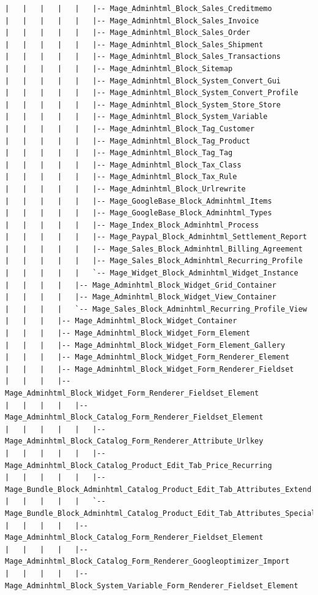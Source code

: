\documentclass[oneside]{book}
\begin{document}
\begin{lstlisting}
|   |   |   |   |   |-- Mage_Adminhtml_Block_Sales_Creditmemo
|   |   |   |   |   |-- Mage_Adminhtml_Block_Sales_Invoice
|   |   |   |   |   |-- Mage_Adminhtml_Block_Sales_Order
|   |   |   |   |   |-- Mage_Adminhtml_Block_Sales_Shipment
|   |   |   |   |   |-- Mage_Adminhtml_Block_Sales_Transactions
|   |   |   |   |   |-- Mage_Adminhtml_Block_Sitemap
|   |   |   |   |   |-- Mage_Adminhtml_Block_System_Convert_Gui
|   |   |   |   |   |-- Mage_Adminhtml_Block_System_Convert_Profile
|   |   |   |   |   |-- Mage_Adminhtml_Block_System_Store_Store
|   |   |   |   |   |-- Mage_Adminhtml_Block_System_Variable
|   |   |   |   |   |-- Mage_Adminhtml_Block_Tag_Customer
|   |   |   |   |   |-- Mage_Adminhtml_Block_Tag_Product
|   |   |   |   |   |-- Mage_Adminhtml_Block_Tag_Tag
|   |   |   |   |   |-- Mage_Adminhtml_Block_Tax_Class
|   |   |   |   |   |-- Mage_Adminhtml_Block_Tax_Rule
|   |   |   |   |   |-- Mage_Adminhtml_Block_Urlrewrite
|   |   |   |   |   |-- Mage_GoogleBase_Block_Adminhtml_Items
|   |   |   |   |   |-- Mage_GoogleBase_Block_Adminhtml_Types
|   |   |   |   |   |-- Mage_Index_Block_Adminhtml_Process
|   |   |   |   |   |-- Mage_Paypal_Block_Adminhtml_Settlement_Report
|   |   |   |   |   |-- Mage_Sales_Block_Adminhtml_Billing_Agreement
|   |   |   |   |   |-- Mage_Sales_Block_Adminhtml_Recurring_Profile
|   |   |   |   |   `-- Mage_Widget_Block_Adminhtml_Widget_Instance
|   |   |   |   |-- Mage_Adminhtml_Block_Widget_Grid_Container
|   |   |   |   |-- Mage_Adminhtml_Block_Widget_View_Container
|   |   |   |   `-- Mage_Sales_Block_Adminhtml_Recurring_Profile_View
|   |   |   |-- Mage_Adminhtml_Block_Widget_Container
|   |   |   |-- Mage_Adminhtml_Block_Widget_Form_Element
|   |   |   |-- Mage_Adminhtml_Block_Widget_Form_Element_Gallery
|   |   |   |-- Mage_Adminhtml_Block_Widget_Form_Renderer_Element
|   |   |   |-- Mage_Adminhtml_Block_Widget_Form_Renderer_Fieldset
|   |   |   |-- Mage_Adminhtml_Block_Widget_Form_Renderer_Fieldset_Element
|   |   |   |   |-- Mage_Adminhtml_Block_Catalog_Form_Renderer_Fieldset_Element
|   |   |   |   |   |-- Mage_Adminhtml_Block_Catalog_Form_Renderer_Attribute_Urlkey
|   |   |   |   |   |-- Mage_Adminhtml_Block_Catalog_Product_Edit_Tab_Price_Recurring
|   |   |   |   |   |-- Mage_Bundle_Block_Adminhtml_Catalog_Product_Edit_Tab_Attributes_Extend
|   |   |   |   |   `-- Mage_Bundle_Block_Adminhtml_Catalog_Product_Edit_Tab_Attributes_Special
|   |   |   |   |-- Mage_Adminhtml_Block_Catalog_Form_Renderer_Fieldset_Element
|   |   |   |   |-- Mage_Adminhtml_Block_Catalog_Form_Renderer_Googleoptimizer_Import
|   |   |   |   |-- Mage_Adminhtml_Block_System_Variable_Form_Renderer_Fieldset_Element

\end{lstlisting}
\end{document}
